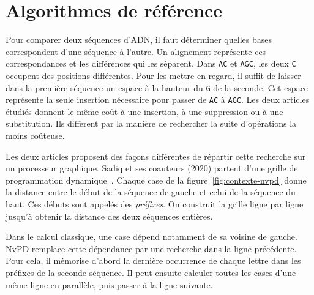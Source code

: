 \section{Algorithmes de référence}\label{sec:contexte}
Pour comparer deux séquences d’ADN, il faut déterminer quelles bases correspondent d’une séquence à l’autre. Un alignement représente ces correspondances et les différences qui les séparent. Dans \texttt{AC} et \texttt{AGC}, les deux \texttt{C} occupent des positions différentes. Pour les mettre en regard, il suffit de laisser dans la première séquence un espace à la hauteur du \texttt{G} de la seconde. Cet espace représente la seule insertion nécessaire pour passer de \texttt{AC} à \texttt{AGC}. Les deux articles étudiés donnent le même coût à une insertion, à une suppression ou à une substitution. Ils diffèrent par la manière de rechercher la suite d’opérations la moins coûteuse.

Les deux articles proposent des façons différentes de répartir cette recherche sur un processeur graphique. Sadiq et ses coauteurs (2020) partent d’une grille de programmation dynamique~\cite{sadiq}. Chaque case de la figure~\ref{fig:contexte-nvpd} donne la distance entre le début de la séquence de gauche et celui de la séquence du haut. Ces débuts sont appelés des \emph{préfixes}. On construit la grille ligne par ligne jusqu’à obtenir la distance des deux séquences entières.

Dans le calcul classique, une case dépend notamment de sa voisine de gauche. NvPD remplace cette dépendance par une recherche dans la ligne précédente. Pour cela, il mémorise d’abord la dernière occurrence de chaque lettre dans les préfixes de la seconde séquence. Il peut ensuite calculer toutes les cases d’une même ligne en parallèle, puis passer à la ligne suivante.


